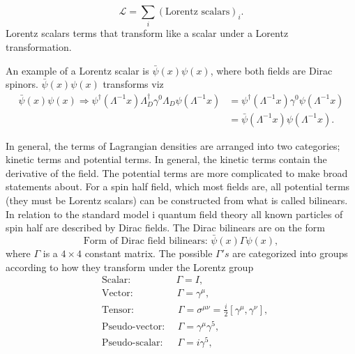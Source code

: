 \begin{equation}
	\mathcal{L}=\sum_i (\text{Lorentz scalars})_i.
\end{equation} 
Lorentz scalars terms that transform like a scalar under a Lorentz transformation.
\begin{example}
	An example of a Lorentz scalar is $\bar{\psi}(x)\psi(x)$, where both fields are Dirac spinors. $\bar{\psi}(x)\psi(x)$ transforms viz
	\begin{equation}
		\begin{split}
			\bar{\psi}(x)\psi(x)\Rightarrow \psi^\dagger(\Lambda ^{-1}x) \Lambda_D^\dagger\gamma^0\Lambda_D\psi(\Lambda^{-1}x)&=\psi^\dagger(\Lambda ^{-1}x) \gamma^0\psi(\Lambda^{-1}x)\\
			&=\bar{\psi}(\Lambda ^{-1}x)\psi(\Lambda^{-1}x).
		\end{split}
	\end{equation} 
\end{example}
In general, the terms of Lagrangian densities are arranged into two categories; kinetic terms and potential terms. In general, the kinetic terms contain the derivative of the field. The potential terms are more complicated to make broad statements about. For a spin half field, which most fields are, all potential terms (they must be Lorentz scalars) can be constructed from what is called bilinears. In relation to the standard model i quantum field theory all known particles of spin half are described by Dirac fields. The Dirac bilinears are on the form
\begin{equation}
	\text{Form of Dirac field bilinears: }\bar{\psi}(x)\Gamma\psi(x),
\end{equation} 
where $\Gamma$ is a $4\times 4$ constant matrix. The possible $\Gamma's$ are categorized into groups according to how they transform under the Lorentz group
\begin{equation}
	\begin{split}
		& \text{Scalar: } \,\,\qquad\qquad \Gamma=I,\\
		& \text{Vector: } \,\qquad\qquad \Gamma=\gamma^\mu,\\
		& \text{Tensor: } \,\qquad\qquad \Gamma=\sigma^{\mu\nu}=\frac{i}{2}[\gamma^\mu,\gamma^\nu],\\
		& \text{Pseudo-vector: } \quad \Gamma=\gamma^\mu\gamma^5,\\
		& \text{Pseudo-scalar: }\, \quad \Gamma=i\gamma^5,\\
	\end{split}
	\label{bilinears}
\end{equation} 
